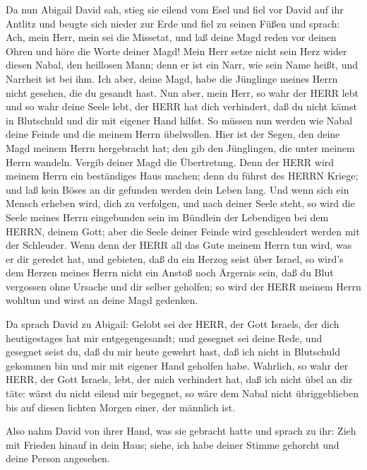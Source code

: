  Da nun Abigail David sah, stieg sie eilend vom Esel und
fiel vor David auf ihr Antlitz und beugte sich nieder zur Erde
 und fiel zu seinen Füßen und sprach: Ach, mein Herr, mein
sei die Missetat, und laß deine Magd reden vor deinen Ohren und höre die
Worte deiner Magd!  Mein Herr setze nicht sein Herz wider
diesen Nabal, den heillosen Mann; denn er ist ein Narr, wie sein Name
heißt, und Narrheit ist bei ihm. Ich aber, deine Magd, habe die
Jünglinge meines Herrn nicht gesehen, die du gesandt hast. 
Nun aber, mein Herr, so wahr der HERR lebt und so wahr deine Seele lebt,
der HERR hat dich verhindert, daß du nicht kämst in Blutschuld und dir
mit eigener Hand hilfst. So müssen nun werden wie Nabal deine Feinde und
die meinem Herrn übelwollen.  Hier ist der Segen, den deine
Magd meinem Herrn hergebracht hat; den gib den Jünglingen, die unter
meinem Herrn wandeln.  Vergib deiner Magd die Übertretung.
Denn der HERR wird meinem Herrn ein beständiges Haus machen; denn du
führst des HERRN Kriege; und laß kein Böses an dir gefunden werden dein
Leben lang.  Und wenn sich ein Mensch erheben wird, dich zu
verfolgen, und nach deiner Seele steht, so wird die Seele meines Herrn
eingebunden sein im Bündlein der Lebendigen bei dem HERRN, deinem Gott;
aber die Seele deiner Feinde wird geschleudert werden mit der Schleuder.
 Wenn denn der HERR all das Gute meinem Herrn tun wird, was
er dir geredet hat, und gebieten, daß du ein Herzog seist über Israel,
 so wird's dem Herzen meines Herrn nicht ein Anstoß noch
Ärgernis sein, daß du Blut vergossen ohne Ursache und dir selber
geholfen; so wird der HERR meinem Herrn wohltun und wirst an deine Magd
gedenken.

 Da sprach David zu Abigail: Gelobt sei der HERR, der Gott
Israels, der dich heutigestages hat mir entgegengesandt; 
und gesegnet sei deine Rede, und gesegnet seist du, daß du mir heute
gewehrt hast, daß ich nicht in Blutschuld gekommen bin und mir mit
eigener Hand geholfen habe.  Wahrlich, so wahr der HERR,
der Gott Israels, lebt, der mich verhindert hat, daß ich nicht übel an
dir täte: wärst du nicht eilend mir begegnet, so wäre dem Nabal nicht
übriggeblieben bis auf diesen lichten Morgen einer, der männlich ist.

 Also nahm David von ihrer Hand, was sie gebracht hatte und
sprach zu ihr: Zieh mit Frieden hinauf in dein Haus; siehe, ich habe
deiner Stimme gehorcht und deine Person angesehen.

